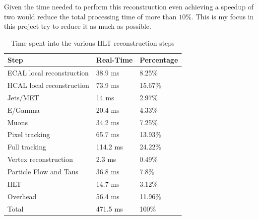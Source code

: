 Given the time needed to perform this reconstruction even achieving a speedup of two would reduce the total processing time of more than $10\%$. This is my focus in this project try to reduce it as much as possible.
\begin{table}[ht]
  \caption{Time spent into the various HLT reconstruction steps}
  \label{table:timeshare}
  \begin{tabular}{lll}
    \hline
    Step                      & Real-Time      & Percentage \\ \hline
    ECAL local reconstruction & 38.9 ms        & 8.25\%     \\
    HCAL local reconstruction & 73.9 ms        & 15.67\%    \\
    Jets/MET                  & 14 ms          & 2.97\%     \\
    E/Gamma                   & 20.4 ms        & 4.33\%     \\
    Muons                     & 34.2 ms        & 7.25\%     \\
    Pixel tracking            & 65.7 ms        & 13.93\%    \\
    Full tracking             & 114.2 ms       & 24.22\%    \\
    Vertex reconstruction     & 2.3 ms         & 0.49\%     \\
    Particle Flow and Taus    & 36.8 ms        & 7.8\%      \\
    HLT                       & 14.7 ms        & 3.12\%     \\
    Overhead                  & 56.4 ms        & 11.96\%    \\
    Total                     & 471.5 ms       & 100\%      \\ \hline
  \end{tabular}
\end{table}
